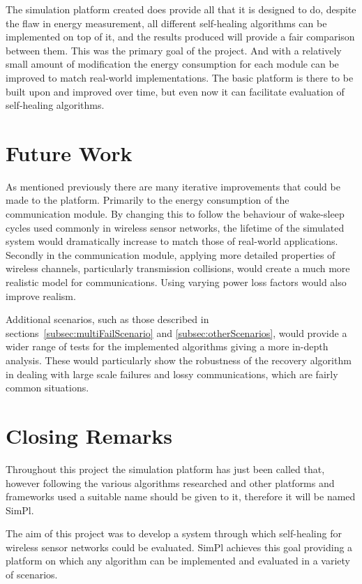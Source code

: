 \documentclass[authoryearcitations]{UoYCSproject}
\begin{document}
The simulation platform created does provide all that it is designed to do, despite the flaw in energy measurement, all different self-healing algorithms can be implemented on top of it, and the results produced will provide a fair comparison between them. This was the primary goal of the project. And with a relatively small amount of modification the energy consumption for each module can be improved to match real-world implementations. The basic platform is there to be built upon and improved over time, but even now it can facilitate evaluation of self-healing algorithms.

\section{Future Work}
As mentioned previously there are many iterative improvements that could be made to the platform. Primarily to the energy consumption of the communication module. By changing this to follow the behaviour of wake-sleep cycles used commonly in wireless sensor networks, the lifetime of the simulated system would dramatically increase to match those of real-world applications. Secondly in the communication module, applying more detailed properties of wireless channels, particularly transmission collisions, would create a much more realistic model for communications. Using varying power loss factors would also improve realism.

Additional scenarios, such as those described in sections~\ref{subsec:multiFailScenario} and \ref{subsec:otherScenarios}, would provide a wider range of tests for the implemented algorithms giving a more in-depth analysis. These would particularly show the robustness of the recovery algorithm in dealing with large scale failures and lossy communications, which are fairly common situations.

\section{Closing Remarks}

Throughout this project the simulation platform has just been called that, however following the various algorithms researched and other platforms and frameworks used a suitable name should be given to it, therefore it will be named SimPl.

The aim of this project was to develop a system through which self-healing for wireless sensor networks could be evaluated. SimPl achieves this goal providing a platform on which any algorithm can be implemented and evaluated in a variety of scenarios.
\end{document}
